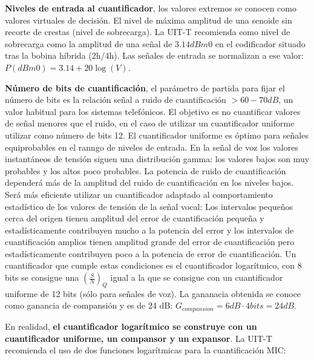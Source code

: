 \documentclass[10pt,portrait, twocolumn]{article}
\makeatletter
\renewcommand{\subsubsection}{\@startsection{subsubsection}{3}{0mm}%
                                {-1ex plus -.5ex minus -.2ex}%
                                {1ex plus .2ex}%
                                {\normalfont\small\bfseries}}
\makeatother
\begin{document}

\textbf{Niveles de entrada al cuantificador}, los valores extremos se conocen como valores virtuales de decisión. El nivel de máxima amplitud de una senoide sin recorte de crestas (nivel de sobrecarga). La UIT-T recomienda como nivel de sobrecarga como la amplitud de una señal de $3.14 dBm0$ en el codificador situado tras la bobina híbrida (2h/4h). Las señales de entrada se normalizan a ese valor:  $P(dBm0) = 3.14 + 20 \log (V)$.


\textbf{Número de bits de cuantificación}, el parámetro de partida para fijar el número de bits es la relación señal a ruido de cuantificación $>60-70dB$, un valor habitual para los sistemas telefónicos. El objetivo es no cuantificar valores de señal menores que el ruido, en el caso de utilizar un cuantificador uniforme utilizar como número de bits 12. El cuantificador uniforme es óptimo para señales equiprobables en el ranngo de niveles de entrada. En la señal de voz los valores instantáneos de tensión siguen una distribución gamma: los valores bajos son muy probables y los altos poco probables. La potencia de ruido de cuantificación dependerá más de la amplitud del ruido de cuantificación en los niveles bajos. Será más eficiente utilizar un cuantificador adaptado al comportamiento estadístico de los valores de tensión de la señal vocal: Los intervalos pequeños cerca del origen tienen amplitud del error de cuantificación pequeña y estadísticamente contribuyen mucho a la potencia del error y los intervalos de cuantificación amplios tienen amplitud grande del error de cuantificación pero estadísticamente contribuyen poco a la potencia de error de cuantificación. Un cuantificador que cumple estas condiciones es el cuantificador logarítmico, con 8 bits se consigue una $(\frac{S}{N})_{Q}$ igual a la que se consigue con un cuantificador uniforme de 12 bits (sólo para señales de voz). La gananacia obtenida se conoce como ganancia de compansión y es de 24 dB: $G_{compansion} = 6 dB \cdot 4 bits = 24 dB$.

En realidad, \textbf{el cuantificador logarítmico se construye con un cuantificador uniforme, un compansor y un expansor}. La UIT-T recomienda el uso de dos funciones logarítmicas para la cuantificación MIC:
\end{document}
